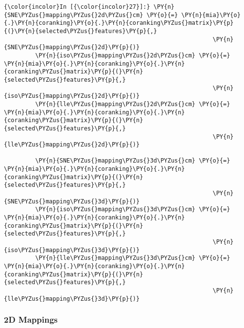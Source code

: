     \begin{Verbatim}[commandchars=\\\{\}]
{\color{incolor}In [{\color{incolor}27}]:} \PY{n}{SNE\PYZus{}mapping\PYZus{}2d\PYZus{}cm} \PY{o}{=} \PY{n}{mia}\PY{o}{.}\PY{n}{coranking}\PY{o}{.}\PY{n}{coranking\PYZus{}matrix}\PY{p}{(}\PY{n}{selected\PYZus{}features}\PY{p}{,}
                                                            \PY{n}{SNE\PYZus{}mapping\PYZus{}2d}\PY{p}{)}
         \PY{n}{iso\PYZus{}mapping\PYZus{}2d\PYZus{}cm} \PY{o}{=} \PY{n}{mia}\PY{o}{.}\PY{n}{coranking}\PY{o}{.}\PY{n}{coranking\PYZus{}matrix}\PY{p}{(}\PY{n}{selected\PYZus{}features}\PY{p}{,}
                                                            \PY{n}{iso\PYZus{}mapping\PYZus{}2d}\PY{p}{)}
         \PY{n}{lle\PYZus{}mapping\PYZus{}2d\PYZus{}cm} \PY{o}{=} \PY{n}{mia}\PY{o}{.}\PY{n}{coranking}\PY{o}{.}\PY{n}{coranking\PYZus{}matrix}\PY{p}{(}\PY{n}{selected\PYZus{}features}\PY{p}{,}
                                                            \PY{n}{lle\PYZus{}mapping\PYZus{}2d}\PY{p}{)}

         \PY{n}{SNE\PYZus{}mapping\PYZus{}3d\PYZus{}cm} \PY{o}{=} \PY{n}{mia}\PY{o}{.}\PY{n}{coranking}\PY{o}{.}\PY{n}{coranking\PYZus{}matrix}\PY{p}{(}\PY{n}{selected\PYZus{}features}\PY{p}{,}
                                                            \PY{n}{SNE\PYZus{}mapping\PYZus{}3d}\PY{p}{)}
         \PY{n}{iso\PYZus{}mapping\PYZus{}3d\PYZus{}cm} \PY{o}{=} \PY{n}{mia}\PY{o}{.}\PY{n}{coranking}\PY{o}{.}\PY{n}{coranking\PYZus{}matrix}\PY{p}{(}\PY{n}{selected\PYZus{}features}\PY{p}{,}
                                                            \PY{n}{iso\PYZus{}mapping\PYZus{}3d}\PY{p}{)}
         \PY{n}{lle\PYZus{}mapping\PYZus{}3d\PYZus{}cm} \PY{o}{=} \PY{n}{mia}\PY{o}{.}\PY{n}{coranking}\PY{o}{.}\PY{n}{coranking\PYZus{}matrix}\PY{p}{(}\PY{n}{selected\PYZus{}features}\PY{p}{,}
                                                            \PY{n}{lle\PYZus{}mapping\PYZus{}3d}\PY{p}{)}
\end{Verbatim}

    \subsubsection{2D Mappings}\label{d-mappings}

